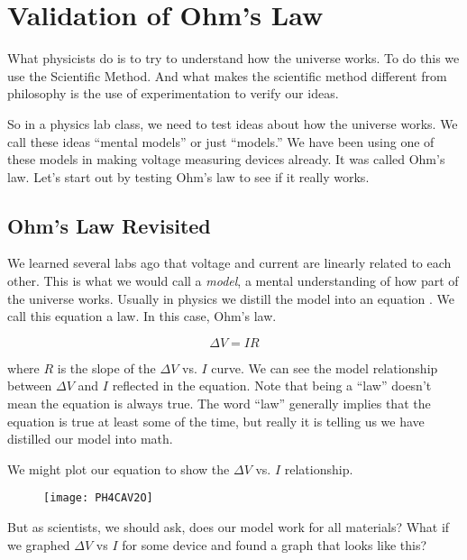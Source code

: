 \chapter{Validation of Ohm's Law}
\vspace{-0.25in}
What physicists do is to try to understand how the universe works. To do this we use the Scientific Method. And what makes the scientific method different from philosophy is the use of experimentation to verify our ideas.

So in a physics lab class, we need to test ideas about how the universe works. We call these ideas ``mental models'' or just ``models.'' We have been using one of these models in making voltage measuring devices already. It was called Ohm's law. Let's start out by testing Ohm's law to see if it really works.

\section{Ohm's Law Revisited}

We learned several labs ago that voltage and current are linearly related to each other. This is what we would call a \emph{model}, a mental understanding of how part of the universe works. Usually in physics we distill the model into an equation . We call this equation a law. In this case, Ohm's law. 

\begin{equation*}
	\Delta V=IR
\end{equation*}

\noindent where $R$ is the slope of the $\Delta V$ vs. $I$ curve. We can see the model relationship between $\Delta V$ and $I$ reflected in the equation. Note that being a ``law'' doesn't mean the equation is always true. The word ``law'' generally implies that the equation is true at least some of the time, but really it is telling us we have distilled our model into math.

We might plot our equation to show the $\Delta V$ vs. $I$ relationship.

\begin{figure}[h!]
	\centering
	\texttt{[image: PH4CAV2O]}
\end{figure}



\noindent But as scientists, we should ask, does our model work for all materials? What if we graphed $\Delta V$ vs $I$ for some device and found a graph that looks like this?

